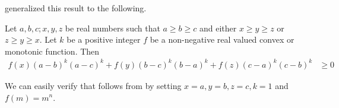 \documentclass{subfile}
\begin{document}
	\textcite{vornicu_2003} generalized this result to the following.
		\begin{theorem}\label{thm:sv}
			Let $a,b,c;x,y,z$ be real numbers such that $a\geq b\geq c$ and either $x\geq y\geq z$ or $z\geq y\geq x$. Let $k$ be a positive integer $f$ be a non-negative real valued convex or monotonic function. Then
				\begin{align*}
					f(x)(a-b)^{k}(a-c)^{k}+f(y)(b-c)^{k}(b-a)^{k}+f(z)(c-a)^{k}(c-b)^{k}
						& \geq 0
				\end{align*}
		\end{theorem}
	We can easily verify that  follows from  by setting $x=a,y=b,z=c,k=1$ and $f(m)=m^{n}$.
\end{document}
